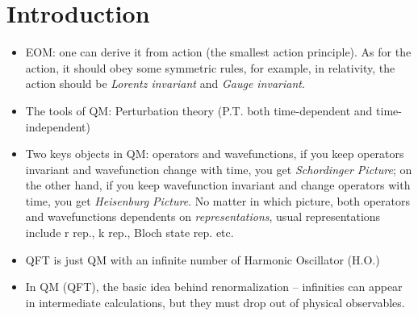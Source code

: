\chapter{Introduction}

\begin{itemize}
    \item EOM: one can derive it from action (the smallest action principle).
	As for the action, it should obey some symmetric rules, for example,
	in relativity, the action should be \emph{Lorentz invariant} and \emph{Gauge invariant}. 
    \item The tools of QM: Perturbation theory (P.T. both time-dependent and time-independent)
    \item Two keys objects in QM: operators and wavefunctions, if you keep 
	operators invariant and wavefunction change with time, you get 
	\emph{Schordinger Picture}; on the other hand, if you keep wavefunction 
	invariant and change operators with time, you get \emph{Heisenburg Picture}.
	No matter in which picture, both operators and wavefunctions dependents on 
	\emph{representations}, usual representations include r rep., k rep.,
	Bloch state rep. etc.
    \item QFT is just QM with an infinite number of Harmonic Oscillator (H.O.)
    \item In QM (QFT), the basic idea behind renormalization -- infinities can 
	appear in intermediate calculations, but they must drop out of physical 
	observables.
\end{itemize}
